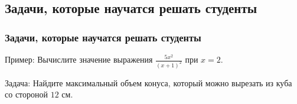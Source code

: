 \subsection{Задачи, которые научатся решать студенты}

\begin{frame} [label=example_solution_back]
	\frametitle{Задачи, которые научатся решать студенты}

    Пример: Вычислите значение выражения $\frac{5x^2}{(x+1)^2}$ при $x=2$.
    \centerline{
    \hyperlink{example_solution}{}
    }

    Задача: Найдите максимальный объем конуса, который можно вырезать из куба со стороной $12$ см.
    \centerline{
    \hyperlink{task_solution}{}
    }
\end{frame}
